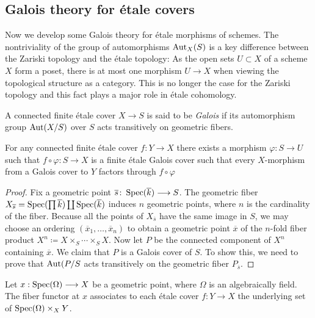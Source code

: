 \subsection{Galois theory for \'etale covers}
Now we develop some Galois theory for \'etale morphisms of schemes. The nontriviality of the group of automorphisms $\operatorname{Aut}_X(S)$ is a key difference between the Zariski topology and the \'etale topology: As the open sets $U \subset X$ of a scheme $X$ form a poset, there is at most one morphism $U \to X$ when viewing the topological structure as a category. This is no longer the case for the Zariski topology and this fact plays a major role in \'etale cohomology.

\begin{definition}
	A connected finite \'etale cover $X \to S$ is said to be \textit{Galois} if its automorphism group $\operatorname{Aut}(X/S)$ over $S$ acts transitively on geometric fibers.
\end{definition}

\begin{proposition}\label{prop:galois_cover_construction}
	For any connected finite \'etale cover $f \colon Y \to X$ there exists a morphism $\varphi \colon S \to U$ such that $f \circ \varphi \colon S \to X$ is a finite \'etale Galois cover such that every $X$-morphism from a Galois cover to $Y$ factors through $f \circ \varphi$
\end{proposition}

\begin{proof}
	Fix a geometric point $\overline{s} \colon \operatorname{Spec}(\overline{k}) \longrightarrow S$. The geometric fiber $X_{\overline{s}} = \operatorname{Spec}(\prod \overline{k}) \coprod \operatorname{Spec}(\overline{k})$ induces $n$ geometric points, where $n$ is the cardinality of the fiber. Because all the points of $X_{\overline{s}}$ have the same image in $S$, we may choose an ordering $(\overline{x}_1, \dots, \overline{x}_n)$ to obtain a geometric point $\overline{x}$ of the $n$-fold fiber product $X^n \coloneqq X \times_S \cdots \times_S X$. Now let $P$ be the connected component of $X^n$ containing $\overline{x}$. We claim that $P$ is a Galois cover of $S$. To show this, we need to prove that $\operatorname{Aut}(P/S$ acts transitively on the geometric fiber $P_{\overline{s}}$.
\end{proof}

\begin{definition}
	Let $x: \operatorname{Spec}(\Omega) \longrightarrow X$ be a geometric point, where $\Omega$ is an algebraically field. The fiber functor at $x$ associates to each \'etale cover $f: Y \to X$ the underlying set of $\operatorname{Spec}(\Omega) \times_X Y$.
\end{definition}

